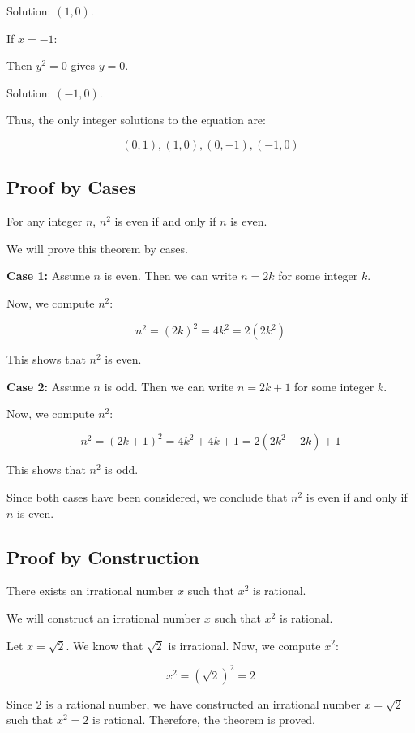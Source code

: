 Solution: \( (1, 0) \).

If \( x = -1 \):

Then \( y^2 = 0 \) gives \( y = 0 \).

Solution: \( (-1, 0) \).

Thus, the only integer solutions to the equation are:
	
\[
	(0, 1), (1, 0), (0, -1), (-1, 0)
\]

\QED

\subsection{Proof by Cases}

For any integer \(n\), \( n^2 \) is even if and only if \(n\) is even.

We will prove this theorem by cases.

\textbf{Case 1:} Assume \(n\) is even. Then we can write \( n = 2k \) for some integer \(k\).

Now, we compute \( n^2 \):

\[
	n^2 = {(2k)}^2 = 4k^2 = 2(2k^2)
\]

This shows that \( n^2 \) is even.

\textbf{Case 2:} Assume \(n\) is odd. Then we can write \( n = 2k + 1 \) for some integer \(k\).

Now, we compute \( n^2 \):

\[
	n^2 = {(2k + 1)}^2 = 4k^2 + 4k + 1 = 2(2k^2 + 2k) + 1
\]

This shows that \( n^2 \) is odd.

Since both cases have been considered, we conclude that \( n^2 \) is even if and only if \(n\) is even.

\QED

\subsection{Proof by Construction}

There exists an irrational number \(x\) such that \( x^2 \) is rational.

We will construct an irrational number \(x\) such that \( x^2 \) is rational.

Let \( x = \sqrt{2} \). We know that \( \sqrt{2} \) is irrational. Now, we compute \( x^2 \):
	
\[
	x^2 = (\sqrt{2})^2 = 2
\]
	
Since 2 is a rational number, we have constructed an irrational number \( x = \sqrt{2} \) such 
that \( x^2 = 2 \) is rational. Therefore, the theorem is proved.

